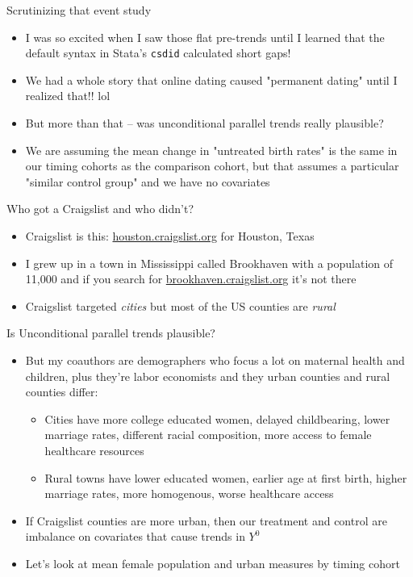 \documentclass{beamer}
\begin{document}
\begin{frame}{Scrutinizing that event study}

\begin{itemize}
\item I was so excited when I saw those flat pre-trends until I learned that the default syntax in Stata's \texttt{csdid} calculated short gaps!
\item We had a whole story that online dating caused "permanent dating" until I realized that!! lol
\item But more than that -- was unconditional parallel trends really plausible?  
\item We are assuming the mean change in "untreated birth rates" is the same in our timing cohorts as the comparison cohort, but that assumes a particular "similar control group" and we have no covariates
\end{itemize}
\end{frame}



\begin{frame}{Who got a Craigslist and who didn't?}

\begin{itemize}

\item Craigslist is this: \url{houston.craigslist.org} for Houston, Texas
\item I grew up in a town in Mississippi called Brookhaven with a population of 11,000 and if you search for \url{brookhaven.craigslist.org} it's not there
\item Craigslist targeted \emph{cities} but most of the US counties are \emph{rural}
\end{itemize}

\end{frame}



\begin{frame}{Is Unconditional parallel trends plausible?}

\begin{itemize}
\item But my coauthors are demographers who focus a lot on maternal health and children, plus they're labor economists and they urban counties and rural counties differ:
	\begin{itemize}
	\item Cities have more college educated women, delayed childbearing, lower marriage rates, different racial composition, more access to female healthcare resources
	\item Rural towns have lower educated women, earlier age at first birth, higher marriage rates, more homogenous, worse healthcare access
	\end{itemize}
\item If Craigslist counties are more urban, then our treatment and control are imbalance on covariates that cause trends in $Y^0$
\item Let's look at mean female population and urban measures by timing cohort
\end{itemize}

\end{frame}
\end{document}
